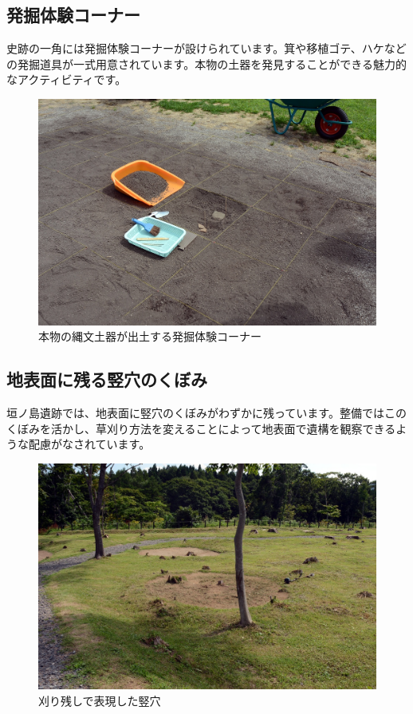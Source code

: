 \documentclass[a4j,11pt,twocolumn,openany]{jsbook}
\begin{document}
\subsection{発掘体験コーナー}

史跡の一角には発掘体験コーナーが設けられています。箕や移植ゴテ、ハケなどの発掘道具が一式用意されています。本物の土器を発見することができる魅力的なアクティビティです。

\begin{figure}[ht]
	\centering
	\includegraphics[width=\linewidth]{fig/01_Iseki_kengaku/14Hakkutu_taiken.JPG}
	\caption{本物の縄文土器が出土する発掘体験コーナー}
	\label{}
\end{figure}

\subsection{地表面に残る竪穴のくぼみ}

垣ノ島遺跡では、地表面に竪穴のくぼみがわずかに残っています。整備ではこのくぼみを活かし、草刈り方法を変えることによって地表面で遺構を観察できるような配慮がなされています。

\begin{figure}[ht]
	\centering
	\includegraphics[width=\linewidth]{fig/01_Iseki_kengaku/15Kakinosima_tateana.JPG}
	\caption{刈り残しで表現した竪穴}
	\label{}
\end{figure}
\end{document}
